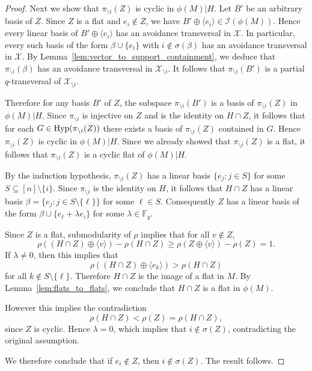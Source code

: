 \documentclass{article}
\theoremstyle{definition}
\begin{document}
\begin{proof}
    Next we show that $\pi_{\setminus i}(Z)$ is cyclic in $\phi(M)|H$. Let $B'$ be an arbitrary basis of $Z$. Since $Z$ is a flat and $e_i\notin Z$, we have $B'\oplus\langle e_i\rangle\in\mathcal{I}(\phi(M))$. Hence every linear basis of $B'\oplus\langle e_i\rangle$ has an avoidance transversal in $\mathcal{X}$. In particular, every such basis of the form $\beta\cup\{e_i\}$ with $i\notin\sigma(\beta)$ has an avoidance transversal in $\mathcal{X}$. By Lemma~\ref{lem:vector_to_support_containment}, we deduce that $\pi_{\setminus i}(\beta)$ has an avoidance transversal in $\mathcal{X}_{\setminus i}$. It follows that $\pi_{\setminus i}(B')$ is a partial $q$-transversal of $\mathcal{X}_{\setminus i}$.

    Therefore for any basis $B'$ of $Z$, the subspace $\pi_{\setminus i}(B')$ is a basis of $\pi_{\setminus i}(Z)$ in $\phi(M)|H$. Since $\pi_{\setminus i}$ is injective on $Z$ and is the identity on $H\cap Z$, it follows that for each $G\in\textup{Hyp}(\pi_{\setminus i}(Z))$ there exists a basis of $\pi_{\setminus i}(Z)$ contained in $G$. Hence $\pi_{\setminus i}(Z)$ is cyclic in $\phi(M)|H$. Since we already showed that $\pi_{\setminus i}(Z)$ is a flat, it follows that $\pi_{\setminus i}(Z)$ is a cyclic flat of $\phi(M)|H$.

    By the induction hypothesis, $\pi_{\setminus i}(Z)$ has a linear basis $\{e_j:j\in S\}$ for some $S\subseteq[n]\setminus\{i\}$. Since $\pi_{\setminus i}$ is the identity on $H$, it follows that $H\cap Z$ has a linear basis $\beta=\{e_j:j\in S\setminus\{\ell\}\}$ for some $\ell\in S$. Consequently $Z$ has a linear basis of the form $\beta\cup\{e_\ell+\lambda e_i\}$ for some $\lambda\in\mathbb{F}_q$.

    Since $Z$ is a flat, submodularity of $\rho$ implies that for all $v\notin Z$,
    \[
        \rho((H\cap Z)\oplus\langle v\rangle)-\rho(H\cap Z)
        \geq
        \rho(Z\oplus\langle v\rangle)-\rho(Z)
        =1 .
    \]
    If $\lambda\neq 0$, then this implies that
    \[
        \rho((H\cap Z)\oplus\langle e_k\rangle)>\rho(H\cap Z)
    \]
    for all $k\notin S\setminus\{\ell\}$. Therefore $H\cap Z$ is the image of a flat in $M$. By Lemma~\ref{lem:flats_to_flats}, we conclude that $H\cap Z$ is a flat in $\phi(M)$.

    However this implies the contradiction
    \[
        \rho(H\cap Z)<\rho(Z)=\rho(H\cap Z),
    \]
    since $Z$ is cyclic. Hence $\lambda=0$, which implies that $i\notin\sigma(Z)$, contradicting the original assumption.

    We therefore conclude that if $e_i\notin Z$, then $i\notin\sigma(Z)$. The result follows.
\end{proof}
\end{document}
